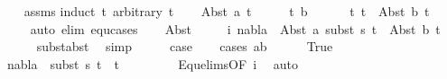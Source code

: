 \begin{isabellebody}
\isadelimproof
\ \ %
\endisadelimproof
%
\isatagproof
{}\isamarkupfalse%
\ assms\isanewline
{}\isamarkupfalse%
{\isacharparenleft}{\kern0pt}induct\ t{}\ arbitrary{\isacharcolon}{\kern0pt}\ t{}{\isacharparenright}{\kern0pt}\isanewline
\ \ \isamarkupfalse%
\ {\isacharparenleft}{\kern0pt}Abst\ a\ t{}{\isacharprime}{\kern0pt}{\isacharparenright}{\kern0pt}\isanewline
\ \ \isamarkupfalse%
\ \isamarkupfalse%
\ t{}{\isacharprime}{\kern0pt}\ b\ \isanewline
\ \ \ \ \ t{}{\isacharcolon}{\kern0pt}\ {\isachardoublequoteopen}t{}\ {\isacharequal}{\kern0pt}\ Abst\ b\ t{}{\isacharprime}{\kern0pt}{\isachardoublequoteclose}\isanewline
\ \ \ \ \isamarkupfalse%
{\isacharparenleft}{\kern0pt}auto\ elim{\isacharcolon}{\kern0pt}\ equ{\isachardot}{\kern0pt}cases{\isacharparenright}{\kern0pt}\isanewline
\ \ \isamarkupfalse%
\ Abst{\isacharparenleft}{\kern0pt}{}{\isacharparenright}{\kern0pt}\ \isamarkupfalse%
\isanewline
\ \ \ \ i{\isacharcolon}{\kern0pt}\ {\isachardoublequoteopen}nabla\ {\isasymturnstile}\ Abst\ a\ {\isacharparenleft}{\kern0pt}subst\ s{}\ t{}{\isacharprime}{\kern0pt}{\isacharparenright}{\kern0pt}\ {\isasymapprox}\ Abst\ b\ t{}{\isacharprime}{\kern0pt}{\isachardoublequoteclose}\isanewline
\ \ \ \ \isamarkupfalse%
\ subst{\isacharunderscore}{\kern0pt}abst\ \isamarkupfalse%
\ simp\isanewline
\ \ \isamarkupfalse%
\ \isamarkupfalse%
\ {\isacharquery}{\kern0pt}case\ \isanewline
\ \ \isamarkupfalse%
{\isacharparenleft}{\kern0pt}cases\ {\isachardoublequoteopen}a{\isacharequal}{\kern0pt}b{\isachardoublequoteclose}{\isacharparenright}{\kern0pt}\isanewline
\ \ \ \ \isamarkupfalse%
\ True\isanewline
\ \ \ \ \isamarkupfalse%
\ {\isachardoublequoteopen}nabla\ {\isasymturnstile}\ {\isacharparenleft}{\kern0pt}subst\ s{}\ t{}{\isacharprime}{\kern0pt}{\isacharparenright}{\kern0pt}\ {\isasymapprox}\ t{}{\isacharprime}{\kern0pt}{\isachardoublequoteclose}\ \isanewline
\ \ \ \ \ \ \isamarkupfalse%
\ Equ{\isacharunderscore}{\kern0pt}elims{\isacharparenleft}{\kern0pt}{}{\isacharparenright}{\kern0pt}{\isacharbrackleft}{\kern0pt}OF\ i{\isacharbrackright}{\kern0pt}\ \isamarkupfalse%
\ auto\isanewline
\ \ \ \ \isamarkupfalse%

\end{isabellebody}
